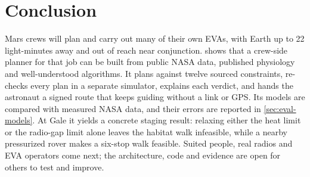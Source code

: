 \section{Conclusion}
\label{sec:conclusion}
Mars crews will plan and carry out many of their own EVAs, with Earth up to 22 light-minutes away and out of reach near conjunction. \Marswalk shows that a crew-side planner for that job can be built from public NASA data, published physiology and well-understood algorithms. It plans against twelve sourced constraints, re-checks every plan in a separate simulator, explains each verdict, and hands the astronaut a signed route that keeps guiding without a link or GPS. Its models are compared with measured NASA data, and their errors are reported in \cref{sec:eval-models}. At Gale it yields a concrete staging result: relaxing either the heat limit or the radio-gap limit alone leaves the habitat walk infeasible, while a nearby pressurized rover makes a six-stop walk feasible. Suited people, real radios and EVA operators come next; the architecture, code and evidence are open for others to test and improve.
